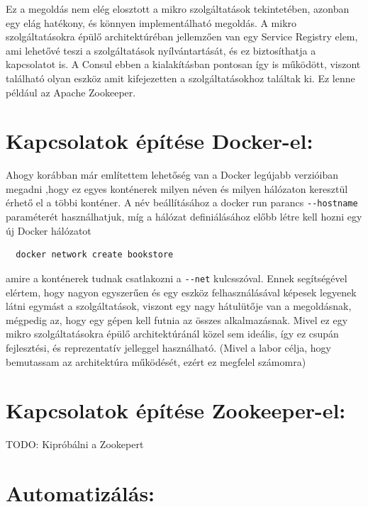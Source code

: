 \documentclass[11pt,magyar,a4paper,oneside,]{report}
\begin{document}
Ez a megoldás nem elég elosztott a mikro szolgáltatások tekintetében,
azonban egy elág hatékony, és könnyen implementálható megoldás. A mikro
szolgáltatásokra épülő architektúréban jellemzően van egy Service
Registry elem, ami lehetővé teszi a szolgáltatások nyílvántartását, és
ez biztosíthatja a kapcsolatot is. A Consul ebben a kialakításban
pontosan így is működött, viszont található olyan eszköz amit
kifejezetten a szolgáltatásokhoz találtak ki. Ez lenne például az Apache
Zookeeper.

\section{Kapcsolatok építése
Docker-el:}\label{kapcsolatok-uxe9puxedtuxe9se-docker-el}

Ahogy korábban már említettem lehetőség van a Docker legújabb verzióiban
megadni ,hogy ez egyes konténerek milyen néven és milyen hálózaton
keresztül érhető el a többi konténer. A név beállításához a docker run
parancs \texttt{-\/-hostname} paraméterét használhatjuk, míg a hálózat
definiálásához előbb létre kell hozni egy új Docker hálózatot

\begin{verbatim}
  docker network create bookstore
\end{verbatim}

amire a konténerek tudnak csatlakozni a \texttt{-\/-net} kulcsszóval.
Ennek segítségével elértem, hogy nagyon egyszerűen és egy eszköz
felhasználásával képesek legyenek látni egymást a szolgáltatások,
viszont egy nagy hátulütője van a megoldásnak, mégpedig az, hogy egy
gépen kell futnia az összes alkalmazásnak. Mivel ez egy mikro
szolgáltatásokra épülő architektúránál közel sem ideális, így ez csupán
fejlesztési, és reprezentatív jelleggel használható. (Mivel a labor
célja, hogy bemutassam az architektúra működését, ezért ez megfelel
számomra)

\section{Kapcsolatok építése
Zookeeper-el:}\label{kapcsolatok-uxe9puxedtuxe9se-zookeeper-el}

TODO: Kipróbálni a Zookepert

\section{Automatizálás:}\label{automatizuxe1luxe1s}
\end{document}

